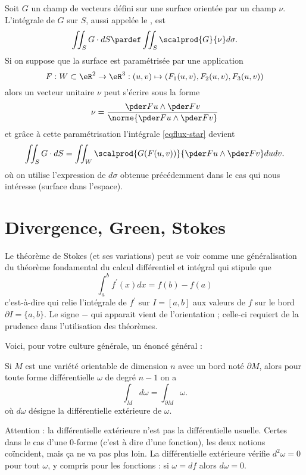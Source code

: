 Soit $G$ un champ de vecteurs défini sur une surface orientée par un
champ $\nu$. L'intégrale de $G$ sur $S$, aussi appelée le , est
\begin{equation}\label{eqflux-star}
  \iint_S G \cdot d S \pardef \iint_S \scalprod{G}{\nu} d \sigma.
\end{equation}
Si on suppose que la surface est paramétrisée par une application
\begin{equation*}
  F : W \subset \eR^2 \to \eR^3 : (u,v) \mapsto (F_1(u,v),F_2(u,v),F_3(u,v))
\end{equation*}
alors un vecteur unitaire $\nu$ peut s'écrire sous la forme
\begin{equation*}
  \nu = \frac{\pder F u \wedge \pder F v}{\norme{\pder F u \wedge \pder F v}}
\end{equation*}
et grâce à cette paramétrisation l'intégrale \eqref{eqflux-star}
devient
\begin{equation*}
  \iint_S G \cdot d S = \iint_W \scalprod{G(F(u,v))}{\pder F u \wedge \pder F v} d u
  d v.
\end{equation*}
où on utilise l'expression de $d \sigma$ obtenue précédemment dans le
cas qui nous intéresse (surface dans l'espace).


\section{Divergence, Green, Stokes}

Le théorème de Stokes (et ses variations) peut se voir comme une généralisation du théorème fondamental du calcul différentiel et intégral qui stipule que
\begin{equation*}
	\int_a^b f^\prime(x) d x = f(b) - f(a)
\end{equation*}
c'est-à-dire qui relie l'intégrale de $f^\prime$ sur $I = [a,b]$ aux valeurs de $f$ sur le bord $\partial I = \{a,b\}$. Le signe $-$ qui apparait vient de l'orientation ; celle-ci requiert de la prudence dans l'utilisation des théorèmes.

Voici, pour votre culture générale, un énoncé général :
\begin{theorem} \label{ThoATsPuzF}
	Si $M$ est une variété orientable de dimension $n$ avec un bord noté $\partial  M$, alors pour toute forme différentielle $\omega$ de degré $n-1$ on a 
	\begin{equation*}
		\int_{ M} d \omega = \int_{\partial  M} \omega.
	\end{equation*}
	où $d \omega$ désigne la différentielle extérieure de $\omega$.
\end{theorem}
Attention : la différentielle extérieure n'est pas la différentielle usuelle. Certes dans le cas d'une \( 0\)-forme (c'est à dire d'une fonction), les deux notions coïncident, mais ça ne va pas plus loin. La différentielle extérieure vérifie \( d^2\omega=0\) pour tout \( \omega\), y compris pour les fonctions : si \( \omega=df\) alors \( d\omega=0\).

